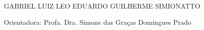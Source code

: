   \begin{capa}
	\begin{center}
	\Large\imprimirinstituicao
	\end{center}

	\begin{center}
	\vspace*{3.4cm}
	\Large GABRIEL LUIZ
	\linebreak
	\Large LEO EDUARDO
	\linebreak
	\Large GUILHERME SIMIONATTO
	\vspace*{1.5cm}
	
	\Large \textbf{\imprimirtitulo}
	
	\vspace*{2.4cm}
	
	\noindent Orientadora: Profa. Dra. Simone das Graças Domingues Prado
	
	\vspace*{2.4cm}
	
	{\large\imprimirlocal}
	\par
	{\large\imprimirdata}
	\vspace*{1cm}
	\end{center}
  \end{capa}